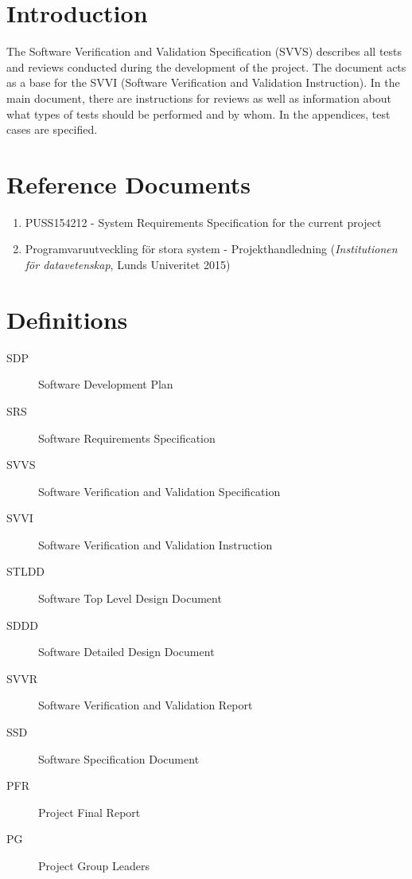 \documentclass[a4paper]{article}
\begin{document}
\setcounter{tocdepth}{2}
\tableofcontents
\newpage
{}

\section{Introduction}
The Software Verification and Validation Specification (SVVS) describes all tests and reviews conducted during the development of the project. The document acts as a base for the SVVI (Software Verification and Validation Instruction).
In the main document, there are instructions for reviews as well as information about what types of tests should be performed and by whom. In the appendices, test cases are specified.

\section{Reference Documents}
\begin{enumerate}
\item PUSS154212 - System Requirements Specification for the current project \label{refdocs:srs}
\item Programvaruutveckling för stora system - Projekthandledning (\textit{Institutionen för datavetenskap}, Lunds Univeritet 2015) \label{refdocs:projekthandledning}
\end{enumerate}

\section{Definitions}
\begin{description}
\item[SDP] Software Development Plan
\item[SRS] Software Requirements Specification
\item[SVVS] Software Verification and Validation Specification
\item[SVVI] Software Verification and Validation Instruction
\item[STLDD] Software Top Level Design Document
\item[SDDD] Software Detailed Design Document
\item[SVVR] Software Verification and Validation Report
\item[SSD] Software Specification Document
\item[PFR] Project Final Report
\item[PG] Project Group Leaders
\end{description}
\end{document}
